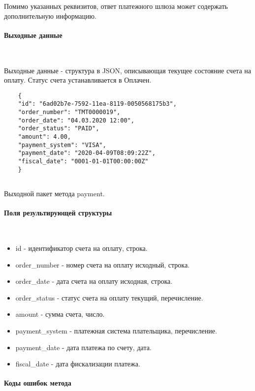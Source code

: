 \documentclass[11pt, a4paper]{article}
\begin{document}
Помимо указанных реквизитов, ответ платежного шлюза может содержать дополнительную информацию.

\paragraph{Выходные данные}\

Выходные данные - структура в JSON, описывающая текущее состояние счета на оплату. Статус счета устанавливается в Оплачен.

\begin{listing}[H]
	\begin{verbatim}
	{
	"id": "6ad02b7e-7592-11ea-8119-0050568175b3",
	"order_number": "ТМТ0000019",
	"order_date": "04.03.2020 12:00",
	"order_status": "PAID",
	"amount": 4.00,
	"payment_system": "VISA",
	"payment_date": "2020-04-09T08:09:22Z",
	"fiscal_date": "0001-01-01T00:00:00Z"
	}
	
	\end{verbatim}
	\caption{Выходной пакет метода payment.} 
\end{listing}

\paragraph{Поля результирующей структуры}\

\begin{itemize}
	\item id - идентификатор счета на оплату, строка.
	\item order\_number - номер счета на оплату исходный, строка.
	\item order\_date - дата счета на оплату исходная, строка.
	\item order\_status - статус счета на оплату текущий, перечисление.
	\item amount - сумма счета, число.
	\item payment\_system - платежная система плательщика, перечисление.
	\item payment\_date - дата платежа по счету, дата.
	\item fiscal\_date - дата фискализации платежа.
\end{itemize}

\paragraph{Коды ошибок метода}\
\end{document}
